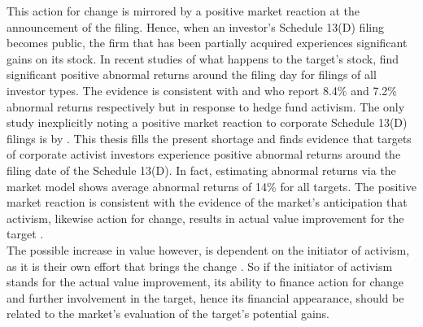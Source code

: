 \documentclass[12pt]{article}
\begin{document}
This action for change is mirrored by a positive market reaction at the announcement of the filing. Hence, when an investor's Schedule 13(D) filing becomes public, the firm that has been partially acquired experiences significant gains on its stock. In recent studies of what happens to the target's stock, \citet[p.1564]{Collin-Dufresne2015} find significant positive abnormal returns around the filing day for filings of all investor types. The evidence is consistent with \citet[p.1756]{Brav2008} and \citet[p.209]{Klein2009} who report 8.4\% and 7.2\% abnormal returns respectively but in response to hedge fund activism. The only study inexplicitly noting a positive market reaction to corporate Schedule 13(D) filings is by \citet[p.29]{Brigida2012}. This thesis fills the present shortage and finds evidence that targets of corporate activist investors experience positive abnormal returns around the filing date of the Schedule 13(D). In fact, estimating abnormal returns via the market model shows average abnormal returns of 14\% for all targets. The positive market reaction is consistent with the evidence of the market's anticipation that activism, likewise action for change, results in actual value improvement for the target \citep[p.1760]{Brav2008}.\\
The possible increase in value however, is dependent on the initiator of activism, as it is their own effort that brings the change \citep[p.1563]{Collin-Dufresne2015}. So if the initiator of activism stands for the actual value improvement, its ability to finance action for change and further involvement in the target, hence its financial appearance, should be related to the market's evaluation of the target's potential gains.
\end{document}
